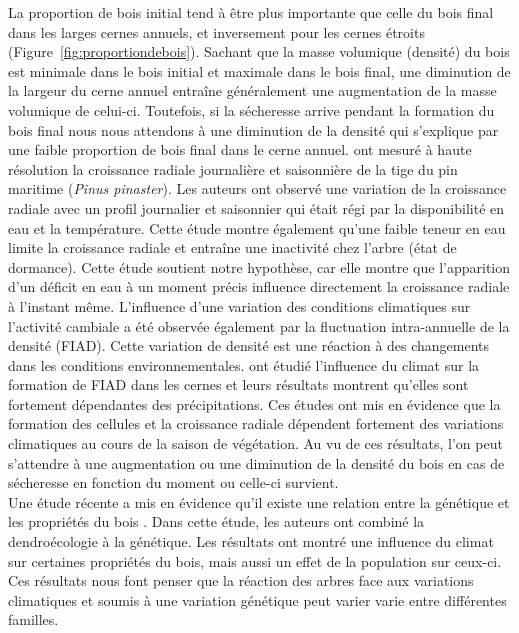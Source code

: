 \documentclass[a4paper,12pt]{report}
\begin{document}
\begin{itemize}
	La proportion de bois initial tend à être plus importante que celle du bois final dans les larges cernes annuels, et inversement pour les cernes étroits \citep{Moore2011} (Figure~\ref{fig:proportiondebois}). Sachant que la masse volumique (densité) du bois est minimale dans le bois initial et maximale dans le bois final, une diminution de la largeur du cerne annuel entraîne généralement une augmentation de la masse volumique de celui-ci. Toutefois, si la sécheresse arrive pendant la formation du bois final nous nous attendons à une diminution de la densité qui s'explique par une faible proportion de bois final dans le cerne annuel. \cite{Vieira2013} ont mesuré à haute résolution la croissance radiale journalière et saisonnière de la tige du pin maritime (\textit{Pinus pinaster}). Les auteurs ont observé une variation de la croissance radiale avec un profil journalier et saisonnier qui était régi par la disponibilité en eau et la température. Cette étude montre également qu'une faible teneur en eau limite la croissance radiale et entraîne une inactivité chez l'arbre (état de dormance). Cette étude soutient notre hypothèse, car elle montre que l'apparition d'un déficit en eau à un moment précis influence directement la croissance radiale à l'instant même. L'influence d'une variation des conditions climatiques sur l'activité cambiale a été observée également par la fluctuation intra-annuelle de la densité (FIAD). Cette variation de densité est une réaction à des changements dans les conditions environnementales. \cite{Vieira2015} ont étudié l'influence du climat sur la formation de FIAD dans les cernes et leurs résultats montrent qu'elles sont fortement dépendantes des précipitations. Ces études ont mis en évidence que la formation des cellules et la croissance radiale dépendent fortement des variations climatiques au cours de la saison de végétation. Au vu de ces résultats, l'on peut s'attendre à une augmentation ou une diminution de la densité du bois en cas de sécheresse en fonction du moment ou celle-ci survient.\\
	Une étude récente a mis en évidence qu'il existe une relation entre la génétique et les propriétés du bois \citep{Housset2018}. Dans cette étude, les auteurs ont combiné la dendroécologie à la génétique. Les résultats ont montré une influence du climat sur certaines propriétés du bois, mais aussi un effet de la population sur ceux-ci. Ces résultats nous font penser que la réaction des arbres face aux variations climatiques et soumis à une variation génétique peut varier varie entre différentes familles.\\
	

\end{itemize}
\end{document}
